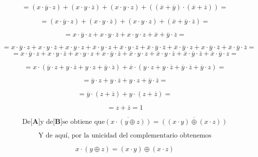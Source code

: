 \begin{enumerate}
\begin{enumerate}
\begin{enumerate}
\begin{enumerate}
        \[{= {{{{({{x \cdot \overline{y}} \cdot z})} + {({{x \cdot y} \cdot \overline{z}})}} + {({{x \cdot y} \cdot z})}} + {({{({\overline{x} + \overline{y}})} \cdot {({\overline{x} + \overline{z}})}})}}} =\]

        \[{= {{{{({{x \cdot \overline{y}} \cdot z})} + {({{x \cdot y} \cdot \overline{z}})}} + {({{x \cdot y} \cdot z})}} + {({\overline{x} + {\overline{y} \cdot \overline{z}}})}}} =\]

        \[{= {{{{{{x \cdot \overline{y}} \cdot z} + {{x \cdot y} \cdot \overline{z}}} + {{x \cdot y} \cdot z}} + \overline{x}} + {\overline{y} \cdot \overline{z}}}} =\]

        \[{= {{{{{{{{{{x \cdot \overline{y}} \cdot z} + {{x \cdot y} \cdot \overline{z}}} + {{x \cdot y} \cdot z}} + {{\overline{x} \cdot y} \cdot z}} + {{\overline{x} \cdot y} \cdot \overline{z}}} + {{\overline{x} \cdot \overline{y}} \cdot \overline{z}}} + {{\overline{x} \cdot \overline{y}} \cdot z}} + {{x \cdot \overline{y}} \cdot \overline{z}}} + {{\overline{x} \cdot \overline{y}} \cdot \overline{z}}}} =\]
        \[{= {{{{{{{{{x \cdot \overline{y}} \cdot z} + {{x \cdot y} \cdot \overline{z}}} + {{x \cdot y} \cdot z}} + {{x \cdot \overline{y}} \cdot \overline{z}}} + {{\overline{x} \cdot y} \cdot z}} + {{\overline{x} \cdot y} \cdot \overline{z}}} + {{\overline{x} \cdot \overline{y}} \cdot \overline{z}}} + {{\overline{x} \cdot \overline{y}} \cdot z}}} =\]

        \[{= {{x \cdot {({{{{\overline{y} \cdot z} + {y \cdot \overline{z}}} + {y \cdot z}} + {\overline{y} \cdot \overline{z}}})}} + {\overline{x} \cdot {({{{{y \cdot z} + {y \cdot \overline{z}}} + {\overline{y} \cdot \overline{z}}} + {\overline{y} \cdot z}})}}}} =\]

        \[{= {{{{\overline{y} \cdot z} + {y \cdot \overline{z}}} + {y \cdot z}} + {\overline{y} \cdot \overline{z}}}} =\]

        \[{= {{\overline{y} \cdot {({z + \overline{z}})}} + {y \cdot {({z + \overline{z}})}}}} =\]

        \[{= {z + \overline{z}}} = 1\]

        \[\text{De}{\lbrack\mathbf{A}\rbrack}\text{y de}{\lbrack\mathbf{B}\rbrack}\text{se obtiene que}{\overline{({x\cdot{({y\oplus z})}})} = \overline{({{({x\cdot y})}\oplus{({x\cdot z})}})}}\]

        \[\text{Y de aquí, por la unicidad del complementario obtenemos}\]

        \[{{x \cdot {({y \oplus z})}} = {({x \cdot y})}} \oplus {({x \cdot z})}\]


\end{enumerate}
\end{enumerate}
\end{enumerate}
\end{enumerate}
